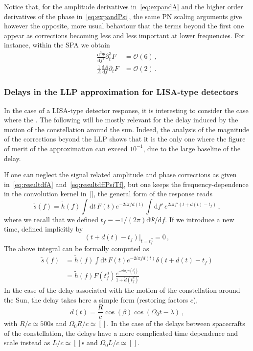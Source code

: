 \documentclass[aps,showpacs,%
prd,superscriptaddress,nofootinbib]{revtex4}
\newcommand{\be}{\begin{equation}}
\newcommand{\ee}{\end{equation}}
\newcommand\ud{{\mathrm{d}}}
\newcommand\calO{{\mathcal{O}}}
\newcommand{\nn}{\nonumber}
\begin{document}
Notice that, for the amplitude derivatives in~\eqref{eq:expandA} and the higher order derivatives of the phase in~\eqref{eq:expandPsi}, the same PN scaling arguments give however the opposite, more usual behaviour that the terms beyond the first one appear as corrections becoming less and less important at lower frequencies. For instance, within the SPA we obtain
%
\begin{subequations}
\begin{align}
	\frac{\ud^{3} \Psi}{\ud f^{3}} \partial_{t}^{3} F &= \calO(6) \,, \\
	\frac{1}{A}\frac{\ud A}{\ud f} \partial_{t} F &= \calO(2) \,.
\end{align}
\end{subequations}
%

\subsubsection{Delays in the LLP approximation for LISA-type detectors}
\label{subsubsec:LISAorbitaldelay}

In the case of a LISA-type detector response, it is interesting to consider the case where the . The following will be mostly relevant for the delay induced by the motion of the constellation around the sun. Indeed, the analysis of the magnitude of the corrections beyond the LLP shows that it is the only one where the figure of merit of the approximation can exceed $10^{-1}$, due to the large baseline of the delay.

If one can neglect the signal related amplitude and phase corrections as given in~\eqref{eq:resultdfA} and~\eqref{eq:resultdffPsiTf}, but one keeps the frequency-dependence in the convolution kernel in~\eqref{}, the general form of the response reads
\begin{equation}
	\tilde{s}(f) = \tilde{h}(f) \int \ud t \, F(t) e^{-2i\pi f d(t)} \int \ud f' \, e^{2i\pi f' (t+d(t) - t_{f})} \,,
\end{equation}
where we recall that we defined $t_{f} \equiv -1/(2\pi)\ud \Psi/\ud f$. If we introduce a new time, defined implicitly by
\be
	\left. (t + d(t) - t_{f})\right|_{t=t_{f}^{d}} = 0 \,,
\ee
The above integral can be formally computed as
\begin{align}
	\tilde{s}(f) &= \tilde{h}(f) \int \ud t \, F(t) e^{-2i\pi f d(t)} \delta(t + d(t) - t_{f}) \nn \\
	&= \tilde{h}(f) F(t_{f}^{d}) \frac{e^{-2i\pi f d(t_{f}^{d})}}{1+\dot{d}(t_{f}^{d})}
\end{align}
In the case of the delay associated with the motion of the constellation around the Sun, the delay takes here a simple form (restoring factors $c$),
\be
	d(t) = \frac{R}{c} \cos(\beta) \cos(\Omega_{0} t -\lambda) \,,
\ee
with $R/c \simeq 500 \mathrm{s}$ and $\Omega_{0}R/c \simeq []$. In the case of the delays between spacecrafts of the constellation, the delays have a more complicated time dependence and scale instead as $L/c \simeq [] \mathrm{s}$ and $\Omega_{0} L/c \simeq []$.
\end{document}
